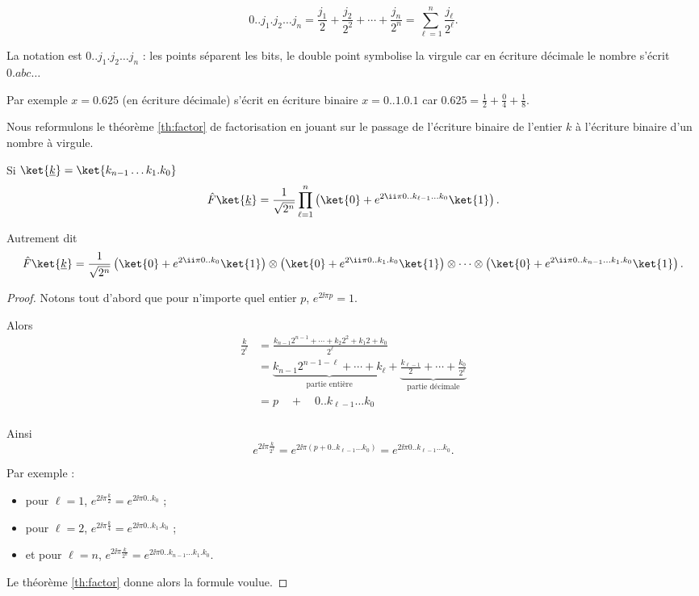 \documentclass[11pt,class=report,crop=false]{standalone}
\begin{document}
$$0..j_1.j_2 \ldots j_n = \frac{j_1}{2} + \frac{j_2}{2^2} + \cdots + \frac{j_n}{2^n}
= \sum_{\ell=1}^{n} \frac{j_\ell}{2^\ell}.$$

La notation est $0..j_1.j_2 \ldots j_n$ : les points séparent les bits, le double point symbolise la virgule car en écriture décimale le nombre s'écrit $0.abc\ldots$

Par exemple $x=0.625$ (en écriture décimale) s'écrit en écriture binaire $x=0..1.0.1$
car $0.625 = \frac{1}{2} + \frac{0}{4} + \frac{1}{8}$.

Nous reformulons le théorème \ref{th:factor} de factorisation en jouant sur le passage de l'écriture binaire de l'entier $k$ à l'écriture binaire d'un nombre à virgule.

\begin{corollaire}
\label{cor:factor}
Si $\ket{\underline k} = \ket{k_{n-1}\ldots k_1.k_0}$
$$\hat F \ket{\underline k} 
= \frac{1}{\sqrt{2^n}} \prod_{\ell=1}^{n} 
\left( \ket{0} + e^{2\ii \pi 0..k_{\ell-1}\ldots k_0} \ket{1} \right).$$
\end{corollaire}
Autrement dit
$$\hat F \ket{\underline k} 
= \frac{1}{\sqrt{2^n}}
 \left(\ket{0} + e^{2\ii \pi 0..k_0} \ket{1}  \right) 
\otimes \left(\ket{0} + e^{2\ii \pi 0..k_1.k_0} \ket{1}  \right) \otimes
\cdots 
\otimes \left(\ket{0} + e^{2\ii \pi 0..k_{n-1} \ldots k_1.k_0} \ket{1}  \right).$$

\begin{proof}
Notons tout d'abord que pour n'importe quel entier $p$, $e^{2\ii\pi p} = 1$.

Alors 
 \begin{align*}
\frac{k}{2^\ell} 
  &= \frac{k_{n-1}2^{n-1} + \cdots + k_2 2^2 + k_1 2 + k_0}{2^\ell} \\
  &= \underbrace{k_{n-1}2^{n-1-\ell} + \cdots + k_\ell}_{\text{partie entière}} +  \underbrace{\frac{k_{\ell-1}}{2} + \cdots + \frac{k_0}{2^{\ell}}}_{\text{partie décimale}}\\
  &= p \quad + \quad  0..k_{\ell-1}\ldots k_0 \\
\end{align*}

Ainsi 
$$e^{2\ii \pi \frac{k}{2^\ell}} = e^{2\ii \pi (p + 0..k_{\ell-1} \ldots k_0)}
= e^{2\ii \pi 0..k_{\ell-1} \ldots k_0}.$$

Par exemple :
\begin{itemize}
  \item pour $\ell=1$, $e^{2\ii \pi \frac{k}{2}} = e^{2\ii \pi 0..k_0}$ ;
  \item pour $\ell=2$, $e^{2\ii \pi \frac{k}{4}} = e^{2\ii \pi 0..k_1.k_0}$ ; 
  \item et pour $\ell=n$, $e^{2\ii \pi \frac{k}{2^n}} = e^{2\ii \pi 0..k_{n-1} \ldots k_1.k_0}$.
\end{itemize}

Le théorème \ref{th:factor} donne alors la formule voulue.
\end{proof}
\end{document}
